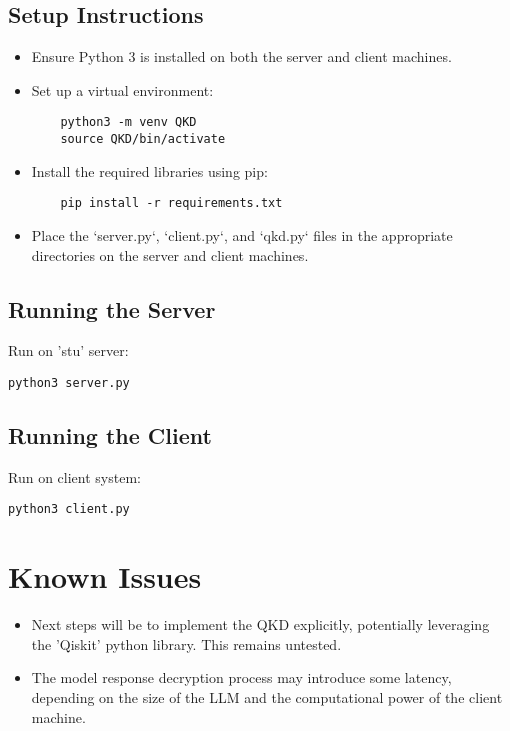 \documentclass{article}
\begin{document}
\subsection{Setup Instructions}
\begin{itemize}
    \item Ensure Python 3 is installed on both the server and client machines.
    \item Set up a virtual environment:
    \begin{verbatim}
    python3 -m venv QKD
    source QKD/bin/activate
    \end{verbatim}
    \item Install the required libraries using pip:
    \begin{verbatim}
    pip install -r requirements.txt
    \end{verbatim}
    \item Place the `server.py`, `client.py`, and `qkd.py` files in the appropriate directories on the server and client machines.
\end{itemize}

\subsection{Running the Server}

Run on 'stu' server:
\begin{verbatim}
python3 server.py
\end{verbatim}

\subsection{Running the Client}

Run on client system:
\begin{verbatim}
python3 client.py
\end{verbatim}

\section{Known Issues}
\begin{itemize}
    \item Next steps will be to implement the QKD explicitly, potentially leveraging the 'Qiskit' python library. This remains untested. 
    \item The model response decryption process may introduce some latency, depending on the size of the LLM and the computational power of the client machine.
\end{itemize}
\end{document}
